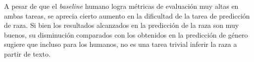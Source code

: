 A pesar de que el \emph{baseline} humano logra m\'etricas de evaluaci\'on muy altas en ambas 
tareas, se aprecia cierto aumento en la dificultad de la tarea de predicci\'on de raza. Si bien 
los resultados alcanzados en la predicci\'on de la raza son muy buenos, su disminuci\'on 
comparados con los obtenidos en la predicci\'on de g\'enero sugiere que incluso para los humanos, 
no es una tarea trivial inferir la raza a partir de texto.